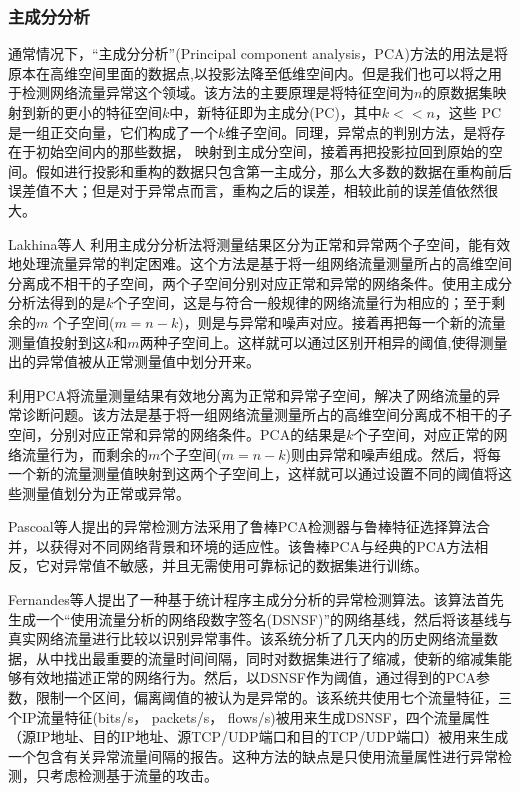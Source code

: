 \subsubsection{主成分分析}
通常情况下，“主成分分析”(Principal component analysis，PCA)方法的用法是将原本在高维空间里面的数据点,以投影法降至低维空间内。但是我们也可以将之用于检测网络流量异常这个领域。该方法的主要原理是将特征空间为$n$的原数据集映射到新的更小的特征空间$k$中，新特征即为主成分(PC)，其中$k<<n$，这些 PC是一组正交向量，它们构成了一个$k$维子空间。同理，异常点的判别方法，是将存在于初始空间内的那些数据， 映射到主成分空间，接着再把投影拉回到原始的空间。假如进行投影和重构的数据只包含第一主成分，那么大多数的数据在重构前后误差值不大；但是对于异常点而言，重构之后的误差，相较此前的误差值依然很大。


Lakhina等人\cite{lakhina2004diagnosing} 利用主成分分析法将测量结果区分为正常和异常两个子空间，能有效地处理流量异常的判定困难。这个方法是基于将一组网络流量测量所占的高维空间分离成不相干的子空间，两个子空间分别对应正常和异常的网络条件。使用主成分分析法得到的是$k$个子空间，这是与符合一般规律的网络流量行为相应的；至于剩余的$m$ 个子空间($m=n-k$)，则是与异常和噪声对应。接着再把每一个新的流量测量值投射到这$k$和$m$两种子空间上。这样就可以通过区别开相异的阈值,使得测量出的异常值被从正常测量值中划分开来。

利用PCA将流量测量结果有效地分离为正常和异常子空间，解决了网络流量的异常诊断问题。该方法是基于将一组网络流量测量所占的高维空间分离成不相干的子空间，分别对应正常和异常的网络条件。PCA的结果是$k$个子空间，对应正常的网络流量行为，而剩余的$m$个子空间($m=n-k$)则由异常和噪声组成。然后，将每一个新的流量测量值映射到这两个子空间上，这样就可以通过设置不同的阈值将这些测量值划分为正常或异常。

Pascoal等人\cite{pascoal2012robust}提出的异常检测方法采用了鲁棒PCA检测器与鲁棒特征选择算法合并，以获得对不同网络背景和环境的适应性。该鲁棒PCA与经典的PCA方法相反，它对异常值不敏感，并且无需使用可靠标记的数据集进行训练。

Fernandes等人\cite{fernandes2016network}提出了一种基于统计程序主成分分析的异常检测算法。该算法首先生成一个“使用流量分析的网络段数字签名(DSNSF)”的网络基线，然后将该基线与真实网络流量进行比较以识别异常事件。该系统分析了几天内的历史网络流量数据，从中找出最重要的流量时间间隔，同时对数据集进行了缩减，使新的缩减集能够有效地描述正常的网络行为。然后，以DSNSF作为阈值，通过得到的PCA参数，限制一个区间，偏离阈值的被认为是异常的。该系统共使用七个流量特征，三个IP流量特征(bits/s， packets/s， flows/s)被用来生成DSNSF，四个流量属性（源IP地址、目的IP地址、源TCP/UDP端口和目的TCP/UDP端口）被用来生成一个包含有关异常流量间隔的报告。这种方法的缺点是只使用流量属性进行异常检测，只考虑检测基于流量的攻击。


